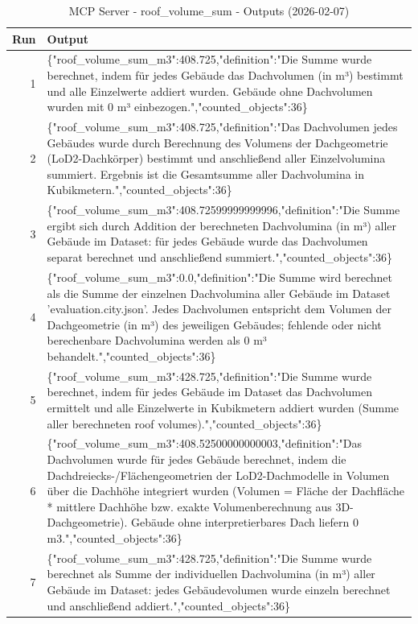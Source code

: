 \documentclass[a4paper,11pt]{article}
\begin{document}
\begin{table}[ht]
\centering
\scriptsize
\caption{MCP Server - roof\_volume\_sum - Outputs (2026-02-07)}
\label{tab:mcp\_roof\_volume\_sum\_outputs\_2026-02-07}
\begin{tabular}{r p{12cm}}
\hline
Run & Output \\
\hline
1 & \{"roof\_volume\_sum\_m3":408.725,"definition":"Die Summe wurde berechnet, indem für jedes Gebäude das Dachvolumen (in m³) bestimmt und alle Einzelwerte addiert wurden. Gebäude ohne Dachvolumen wurden mit 0 m³ einbezogen.","counted\_objects":36\} \\
2 & \{"roof\_volume\_sum\_m3":408.725,"definition":"Das Dachvolumen jedes Gebäudes wurde durch Berechnung des Volumens der Dachgeometrie (LoD2-Dachkörper) bestimmt und anschließend aller Einzelvolumina summiert. Ergebnis ist die Gesamtsumme aller Dachvolumina in Kubikmetern.","counted\_objects":36\} \\
3 & \{"roof\_volume\_sum\_m3":408.72599999999996,"definition":"Die Summe ergibt sich durch Addition der berechneten Dachvolumina (in m³) aller Gebäude im Dataset: für jedes Gebäude wurde das Dachvolumen separat berechnet und anschließend summiert.","counted\_objects":36\} \\
4 & \{"roof\_volume\_sum\_m3":0.0,"definition":"Die Summe wird berechnet als die Summe der einzelnen Dachvolumina aller Gebäude im Dataset 'evaluation.city.json'. Jedes Dachvolumen entspricht dem Volumen der Dachgeometrie (in m³) des jeweiligen Gebäudes; fehlende oder nicht berechenbare Dachvolumina werden als 0 m³ behandelt.","counted\_objects":36\} \\
5 & \{"roof\_volume\_sum\_m3":428.725,"definition":"Die Summe wurde berechnet, indem für jedes Gebäude im Dataset das Dachvolumen ermittelt und alle Einzelwerte in Kubikmetern addiert wurden (Summe aller berechneten roof volumes).","counted\_objects":36\} \\
6 & \{"roof\_volume\_sum\_m3":408.52500000000003,"definition":"Das Dachvolumen wurde für jedes Gebäude berechnet, indem die Dachdreiecks-/Flächengeometrien der LoD2-Dachmodelle in Volumen über die Dachhöhe integriert wurden (Volumen = Fläche der Dachfläche * mittlere Dachhöhe bzw. exakte Volumenberechnung aus 3D-Dachgeometrie). Gebäude ohne interpretierbares Dach liefern 0 m3.","counted\_objects":36\} \\
7 & \{"roof\_volume\_sum\_m3":428.725,"definition":"Die Summe wurde berechnet als Summe der individuellen Dachvolumina (in m³) aller Gebäude im Dataset: jedes Gebäudevolumen wurde einzeln berechnet und anschließend addiert.","counted\_objects":36\} \\

\end{tabular}
\end{table}
\end{document}
